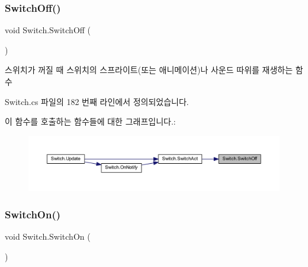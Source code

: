 \mbox{\label{class_switch_a1923f31d7df5390e442cf2ffa9d3292a}} 
\subsubsection{\texorpdfstring{SwitchOff()}{SwitchOff()}}
{\footnotesize\ttfamily void Switch.\+Switch\+Off (\begin{DoxyParamCaption}{ }\end{DoxyParamCaption})\hspace{0.3cm}{\ttfamily [protected]}}



스위치가 꺼질 때 스위치의 스프라이트(또는 애니메이션)나 사운드 따위를 재생하는 함수 



Switch.\+cs 파일의 182 번째 라인에서 정의되었습니다.


\begin{DoxyCode}{0}

\end{DoxyCode}
이 함수를 호출하는 함수들에 대한 그래프입니다.\+:
\nopagebreak
\begin{figure}[H]
\begin{center}
\leavevmode
\includegraphics[width=350pt]{d9/d47/class_switch_a1923f31d7df5390e442cf2ffa9d3292a_icgraph}
\end{center}
\end{figure}
\mbox{\label{class_switch_ad2aa17a4a56cc1fe70a96dc94371c388}} 
\subsubsection{\texorpdfstring{SwitchOn()}{SwitchOn()}}
{\footnotesize\ttfamily void Switch.\+Switch\+On (\begin{DoxyParamCaption}{ }\end{DoxyParamCaption})\hspace{0.3cm}{\ttfamily [protected]}}



